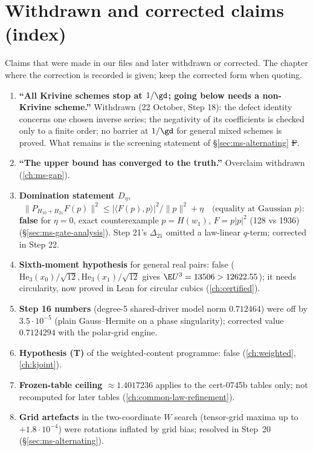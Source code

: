 \section{Withdrawn and corrected claims (index)}\label{sec:ms-withdrawn}
Claims that were made in our files and later withdrawn or corrected. The chapter where the correction is recorded is
given; keep the corrected form when quoting.
\begin{enumerate}
\item \textbf{``All Krivine schemes stop at $1/\gd$; going below needs a non-Krivine scheme.''} Withdrawn (22 October, Step 18):
  the defect identity concerns one chosen inverse series; the negativity of its coefficients is checked only to a finite
  order; no barrier at $1/\gd$ for general mixed schemes is proved. What remains is the screening statement of
  \S\ref{sec:ms-alternating} \st{F}.
\item \textbf{``The upper bound has converged to the truth.''} Overclaim withdrawn (\autoref{ch:ms-gap}).
\item \textbf{Domination statement $D_\eta$},
  \[\|P_{H_{10}+H_{21}}F(p)\|^2\le|\langle F(p),p\rangle|^2/\|p\|^2+\eta\quad\text{(equality at Gaussian $p$)}:\]
  \textbf{false} for $\eta=0$, exact counterexample $p=H(w_1)$, $F=p|p|^2$ (128 vs 1936)
  (\S\ref{sec:ms-gate-analysis}). Step 21's $\Delta_{21}$ omitted a law-linear $q$-term; corrected in Step 22.
\item \textbf{Sixth-moment hypothesis } for general real  pairs: false
  ($\mathrm{He}_3(x_0)/\sqrt{12},\mathrm{He}_3(x_1)/\sqrt{12}$ gives $\E U^3=13506>12622.55$); it needs circularity, now
  proved in Lean for circular cubics (\autoref{ch:certified}).
\item \textbf{Step 16 numbers} (degree-5 shared-driver model norm $0.712464$) were off by $3.5\cdot10^{-5}$ (plain
  Gauss--Hermite on a phase singularity); corrected value $0.7124294$ with the polar-grid engine.
\item \textbf{Hypothesis (T)} of the weighted-content programme: false (\autoref{ch:weighted}, \autoref{ch:kjoint}).
\item \textbf{Frozen-table ceiling $\approx1.4017236$} applies to the cert-0745b tables only; not recomputed for later tables
  (\autoref{ch:common-law-refinement}).
\item \textbf{Grid artefacts} in the two-coordinate $W$ search (tensor-grid maxima up to $+1.8\cdot10^{-4}$) were rotations
  inflated by grid bias; resolved in Step~20 (\S\ref{sec:ms-alternating}).
\end{enumerate}
